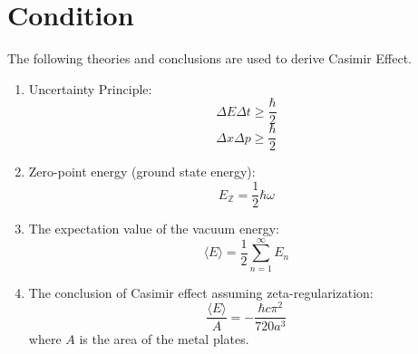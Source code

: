 \section{Condition}
The following theories and conclusions are used to derive Casimir Effect.
\begin{enumerate}
    \item Uncertainty Principle:
        \[\Delta E \Delta t \ge \frac{\hbar}{2}\]
        \[\Delta x \Delta p \ge \frac{\hbar}{2}\]
    \item Zero-point energy (ground state energy): \[E_{\mathbb{Z}} = \frac{1}{2}\hbar\omega\]
    \item The expectation value of the vacuum energy: \[\langle E \rangle = \frac{1}{2}\sum_{n=1}^{\infty} E_n\]
    \item The conclusion of Casimir effect assuming zeta-regularization: 
    \[\frac{\langle E \rangle}{A} = -\frac{\hbar c \pi^2}{720 a^3}\]
    where \(A\) is the area of the metal plates. \cite{casimir}
\end{enumerate}